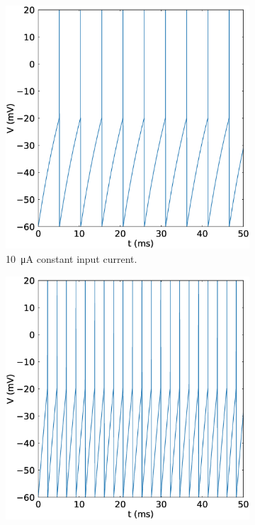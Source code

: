 \documentclass{scrartcl}			%
\begin{document}
\begin{figure}[h] 
  \begin{subfigure}[b]{0.5\linewidth}
    \centering
    \includegraphics[width=\linewidth]{imgs/10muA_const_curr.eps} 
    \caption{\SI{10}{\micro\ampere} constant input current.} 
    \label{fig:10const} 
    \quad
  \end{subfigure}%
  \begin{subfigure}[b]{0.5\linewidth}
    \centering
    \includegraphics[width=\linewidth]{imgs/20muA_const_curr.eps} 

\end{subfigure}
\end{figure}
\end{document}
